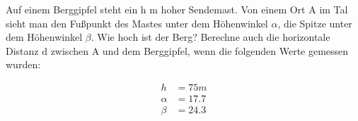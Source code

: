 
Auf einem Berggipfel steht ein h m hoher Sendemast. Von einem Ort A im Tal sieht man den Fußpunkt des Mastes
unter dem Höhenwinkel $\alpha$, die Spitze unter dem Höhenwinkel $\beta$. Wie hoch ist der Berg? Berechne
auch die horizontale Distanz d zwischen A und dem Berggipfel, wenn die folgenden Werte gemessen wurden:

\begin{align}
	h &= 75 m\\
	\alpha &= 17.7\\
	\beta &= 24.3
\end{align}
